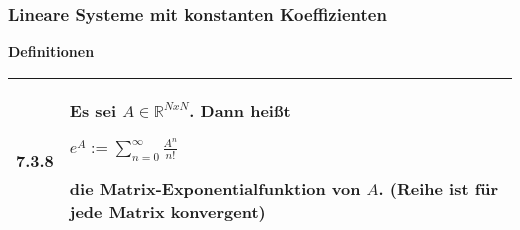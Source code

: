     \pagebreak

\subsubsection{Lineare Systeme mit konstanten Koeffizienten}

    \noindent
    \textbf{Definitionen}
    \begin{table}[H]  
    \begin{tabularx}{\textwidth}{X m{16cm}}
        \toprule

        7.3.8 & Es sei $A\in \mathbb{R}^{NxN}$. Dann heißt \hfill \break
                \centerline{$ e^A := \sum^{\infty}_{n=0} \frac{A^n}{n!} $}
                die \textbf{Matrix-Exponentialfunktion} von $A$. \hfill \break
                (Reihe ist für jede Matrix konvergent)\\

        \bottomrule

    \end{tabularx}
    \end{table}

